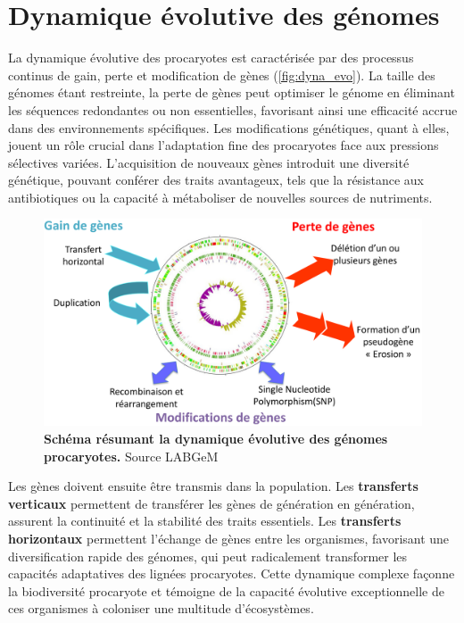 \newpage
\section{Dynamique évolutive des génomes}
\label{sec:dyn_evo}

La dynamique évolutive des procaryotes est caractérisée par des processus continus de gain, perte et modification de gènes (\autoref{fig:dyna_evo}). La taille des génomes étant restreinte, la perte de gènes peut optimiser le génome en éliminant les séquences redondantes ou non essentielles, favorisant ainsi une efficacité accrue dans des environnements spécifiques. Les modifications génétiques, quant à elles, jouent un rôle crucial dans l'adaptation fine des procaryotes face aux pressions sélectives variées. L'acquisition de nouveaux gènes introduit une diversité génétique, pouvant conférer des traits avantageux, tels que la résistance aux antibiotiques ou la capacité à métaboliser de nouvelles sources de nutriments.

\begin{figure}[htbp]
    \centering
    \includegraphics[width=\linewidth]{images/DynamiqueEvo.png}
    \caption[Schéma de la dynamique évolutive des génomes procaryotes]{\textbf{Schéma résumant la dynamique évolutive des génomes procaryotes.} Source LABGeM}
    \label{fig:dyna_evo}
\end{figure}

 Les gènes doivent ensuite être transmis dans la population. Les \textbf{transferts verticaux} permettent de transférer les gènes de génération en génération, assurent la continuité et la stabilité des traits essentiels. Les \textbf{transferts horizontaux} permettent l'échange de gènes entre les organismes, favorisant une diversification rapide des génomes, qui peut radicalement transformer les capacités adaptatives des lignées procaryotes. Cette dynamique complexe façonne la biodiversité procaryote et témoigne de la capacité évolutive exceptionnelle de ces organismes à coloniser une multitude d'écosystèmes.


